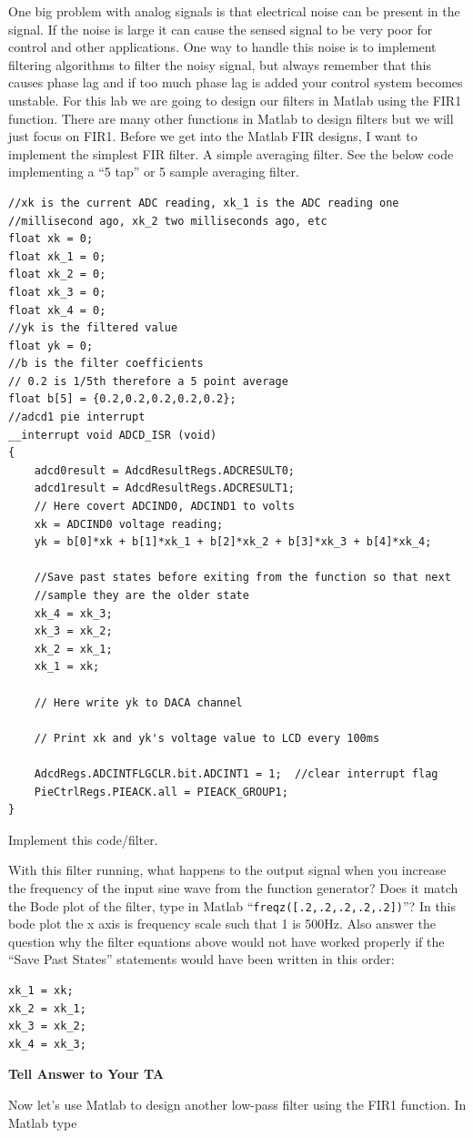 \documentclass[11pt]{article}
\begin{document}
One big problem with analog signals is that electrical noise can be present in the signal. If the noise is large it can cause the sensed signal to be very poor for control and other applications. One way to handle this noise is to implement filtering algorithms to filter the noisy signal, but always remember that this causes phase lag and if too much phase lag is added your control system becomes unstable. For this lab we are going to design our filters in Matlab using the FIR1 function. There are many other functions in Matlab to design filters but we will just focus on FIR1. Before we get into the Matlab FIR designs, I want to implement the simplest FIR filter. A simple averaging filter. See the below code implementing a “5 tap” or 5 sample averaging filter.
%
\begin{verbatim}
//xk is the current ADC reading, xk_1 is the ADC reading one
//millisecond ago, xk_2 two milliseconds ago, etc
float xk = 0;
float xk_1 = 0;
float xk_2 = 0;
float xk_3 = 0;
float xk_4 = 0;
//yk is the filtered value
float yk = 0;
//b is the filter coefficients
// 0.2 is 1/5th therefore a 5 point average
float b[5] = {0.2,0.2,0.2,0.2,0.2};
//adcd1 pie interrupt
__interrupt void ADCD_ISR (void)
{
    adcd0result = AdcdResultRegs.ADCRESULT0;
    adcd1result = AdcdResultRegs.ADCRESULT1;
    // Here covert ADCIND0, ADCIND1 to volts
    xk = ADCIND0 voltage reading;
    yk = b[0]*xk + b[1]*xk_1 + b[2]*xk_2 + b[3]*xk_3 + b[4]*xk_4;

    //Save past states before exiting from the function so that next
    //sample they are the older state
    xk_4 = xk_3;
    xk_3 = xk_2;
    xk_2 = xk_1;
    xk_1 = xk;

    // Here write yk to DACA channel

    // Print xk and yk's voltage value to LCD every 100ms

    AdcdRegs.ADCINTFLGCLR.bit.ADCINT1 = 1;  //clear interrupt flag
    PieCtrlRegs.PIEACK.all = PIEACK_GROUP1;
}
\end{verbatim}
%
Implement this code/filter.
%
\begin{checkoff}
        With this filter running, what happens to the output signal when you increase the frequency of the input sine wave from the function generator? Does it match the Bode plot of the filter, type in Matlab “\texttt{freqz([.2,.2,.2,.2,.2])}”? In this bode plot the x axis is frequency scale such that 1 is 500Hz. Also answer the question why the filter equations above would not have worked properly if the “Save Past States” statements would have been written in this order:
\begin{verbatim}
xk_1 = xk;
xk_2 = xk_1;
xk_3 = xk_2;
xk_4 = xk_3;
\end{verbatim}
        \textbf{Tell Answer to Your TA}
\end{checkoff}
%
Now let’s use Matlab to design another low-pass filter using the FIR1 function. In Matlab type
\end{document}
